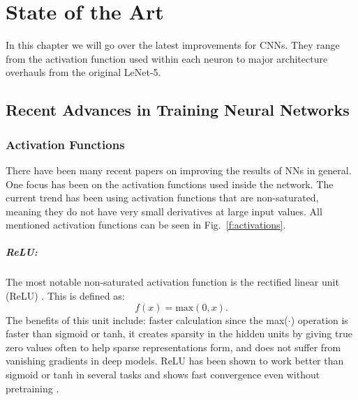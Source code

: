 \chapter{State of the Art}\label{StateOfTheArt}
In this chapter we will go over the latest improvements for CNNs. 
They range from the activation function used within each neuron to major architecture overhauls from the original LeNet-5.


\section{Recent Advances in Training Neural Networks}\label{s:NNAdvances}

\subsection{Activation Functions}
There have been many recent papers on improving the results of NNs in general. One focus has been on the activation functions used inside the network. The current trend has been using activation functions that are non-saturated, meaning they do not have very small derivatives at large input values. All mentioned activation functions can be seen in Fig.~\ref{f:activations}.

\paragraph{ReLU:}
The most notable non-saturated activation function is the rectified linear unit (ReLU) \cite{nair2010rectified}. This is defined as:
\begin{equation}
f(x) = \mbox{max}(0,x).
\label{e:relu}
\end{equation}
The benefits of this unit include: faster calculation since the max($\cdot$) operation is faster than sigmoid or tanh, it creates sparsity in the hidden units by giving true zero values often to help sparse representations form, and does not suffer from vanishing gradients in deep models. ReLU has been shown to work better than sigmoid or tanh in several tasks and shows fast convergence even without pretraining \cite{glorot2011deep,krizhevsky2012imagenet,zeiler2013rectified,maas2013rectifier}.


